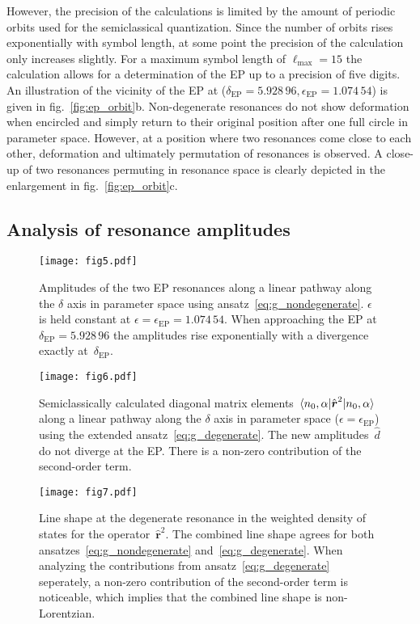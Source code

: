 \documentclass[doublecol]{epl2}
\renewcommand{\vec}[1]{\boldsymbol{#1}}
\newcommand{\num}{}
\begin{document}
However, the precision of the calculations is limited by the amount of periodic orbits used for the semiclassical quantization. Since the number of orbits rises exponentially with symbol length, at some point the precision of the calculation only increases slightly. For a maximum symbol length of $\ell_\mathrm{max} = 15$ the calculation allows for a determination of the EP up to a precision of five digits. An illustration of the vicinity of the EP at ($\delta_\mathrm{EP} = \num{5.928\,96}, \epsilon_\mathrm{EP} = \num{1.074\,54}$) is given in fig.~\ref{fig:ep_orbit}b. Non-degenerate resonances do not show deformation when encircled and simply return to their original position after one full circle in parameter space. However, at a position where two resonances come close to each other, deformation and ultimately permutation of resonances is observed. A close-up of two resonances permuting in resonance space is clearly depicted in the enlargement in fig.~\ref{fig:ep_orbit}c.


\subsection{Analysis of resonance amplitudes}
\begin{figure}[t]
  \texttt{[image: fig5.pdf]}
  \caption{Amplitudes of the two EP resonances along a linear pathway along the $\delta$ axis in parameter space using ansatz~\eqref{eq:g_nondegenerate}. $\epsilon$ is held constant at $\epsilon = \epsilon_\mathrm{EP} = \num{1.074\,54}$. When approaching the EP at $\delta_\mathrm{EP} = \num{5.928\,96}$ the amplitudes rise exponentially with a divergence exactly at~$\delta_\mathrm{EP}$.}
  \label{fig:ep_linear_zdod1}
\end{figure}

\begin{figure}[t]
  \centering
  \texttt{[image: fig6.pdf]}
  \caption{Semiclassically calculated diagonal matrix elements~$\braket{n_0, \alpha | \hat{\vec{r}}^2 | n_0, \alpha}$ along a linear pathway along the $\delta$ axis in parameter space ($\epsilon = \epsilon_\mathrm{EP}$) using the extended ansatz~\eqref{eq:g_degenerate}. The new amplitudes~$\hat{d}$ do not diverge at the EP. There is a non-zero contribution of the second-order term.}
  \label{fig:ep_linear}
\end{figure}

\begin{figure}[t]
  \centering
  \texttt{[image: fig7.pdf]}
  \caption{Line shape at the degenerate resonance in the weighted density of states for the operator~$\hat{\vec{r}}^2$. The combined line shape agrees for both ansatzes~\eqref{eq:g_nondegenerate} and~\eqref{eq:g_degenerate}. When analyzing the contributions from ansatz~\eqref{eq:g_degenerate} seperately, a non-zero contribution of the second-order term is noticeable, which implies that the combined line shape is non-Lorentzian.}
  \label{fig:linear_nonlorentz}
\end{figure}
\end{document}
